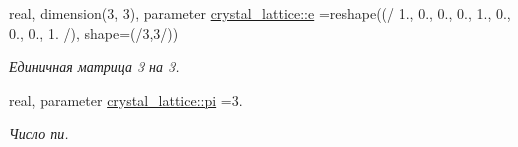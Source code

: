 \begin{DoxyCompactItemize}
$$real, dimension(3, 3), parameter \mbox{\hyperlink{namespacecrystal__lattice_af8549fdb12c45e36845321078acf5a90}{crystal\+\_\+lattice\+::e}} =reshape((/ 1., 0., 0., 0., 1., 0., 0., 0., 1. /), shape=(/3,3/))
\begin{DoxyCompactList}\small\item\em Единичная матрица 3 на 3. \end{DoxyCompactList}\item 
real, parameter \mbox{\hyperlink{namespacecrystal__lattice_ae015f095c2db99127ae9465dcb443e29}{crystal\+\_\+lattice\+::pi}} =3.
\begin{DoxyCompactList}\small\item\em Число пи. \end{DoxyCompactList}\end{DoxyCompactItemize}
